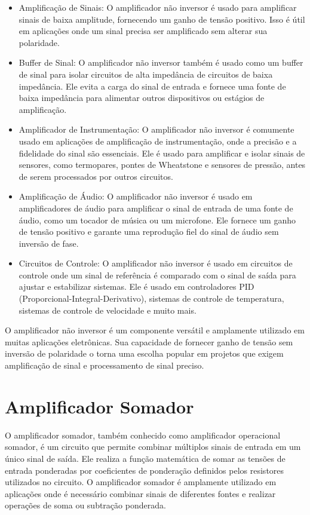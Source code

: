 \documentclass[12pt,twoside, a4paper, twocolumn]{article}
\begin{document}
\begin{itemize}
    \item Amplificação de Sinais: O amplificador não inversor é usado para amplificar sinais de baixa amplitude, fornecendo um ganho de tensão positivo. Isso é útil em aplicações onde um sinal precisa ser amplificado sem alterar sua polaridade.
    \item Buffer de Sinal: O amplificador não inversor também é usado como um buffer de sinal para isolar circuitos de alta impedância de circuitos de baixa impedância. Ele evita a carga do sinal de entrada e fornece uma fonte de baixa impedância para alimentar outros dispositivos ou estágios de amplificação.
    \item Amplificador de Instrumentação: O amplificador não inversor é comumente usado em aplicações de amplificação de instrumentação, onde a precisão e a fidelidade do sinal são essenciais. Ele é usado para amplificar e isolar sinais de sensores, como termopares, pontes de Wheatstone e sensores de pressão, antes de serem processados por outros circuitos.
    \item Amplificação de Áudio: O amplificador não inversor é usado em amplificadores de áudio para amplificar o sinal de entrada de uma fonte de áudio, como um tocador de música ou um microfone. Ele fornece um ganho de tensão positivo e garante uma reprodução fiel do sinal de áudio sem inversão de fase.
    \item Circuitos de Controle: O amplificador não inversor é usado em circuitos de controle onde um sinal de referência é comparado com o sinal de saída para ajustar e estabilizar sistemas. Ele é usado em controladores PID (Proporcional-Integral-Derivativo), sistemas de controle de temperatura, sistemas de controle de velocidade e muito mais.
\end{itemize}

O amplificador não inversor é um componente versátil e amplamente utilizado em muitas aplicações eletrônicas. Sua capacidade de fornecer ganho de tensão sem inversão de polaridade o torna uma escolha popular em projetos que exigem amplificação de sinal e processamento de sinal preciso.

\newpage

\section{Amplificador Somador}

O amplificador somador, também conhecido como amplificador operacional somador, é um circuito que permite combinar múltiplos sinais de entrada em um único sinal de saída. Ele realiza a função matemática de somar as tensões de entrada ponderadas por coeficientes de ponderação definidos pelos resistores utilizados no circuito. O amplificador somador é amplamente utilizado em aplicações onde é necessário combinar sinais de diferentes fontes e realizar operações de soma ou subtração ponderada.
\end{document}
